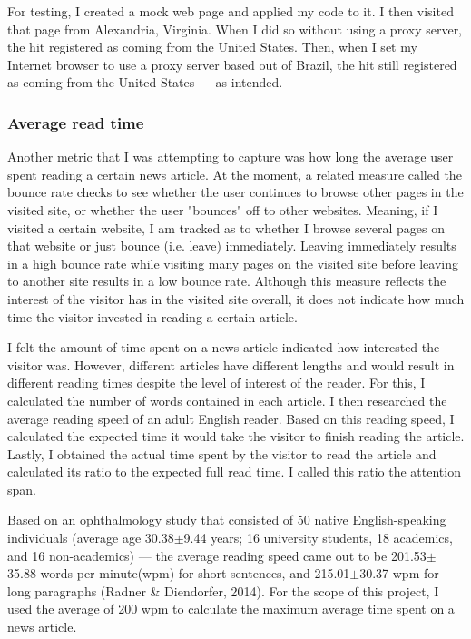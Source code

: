 \documentclass[12pt]{article}
\begin{document}
For testing, I created a mock web page and applied my code to it. I then visited that page from Alexandria, Virginia. When I did so without using a proxy server, the hit registered as coming from the United States. Then, when I set my Internet browser to use a proxy server based out of Brazil, the hit still registered as coming from the United States --- as intended.

\subsubsection{Average read time}

Another metric that I was attempting to capture was how long the average user spent reading a certain news article. At the moment, a related measure called the bounce rate checks to see whether the user continues to browse other pages in the visited site, or whether the user "bounces" off to other websites. Meaning, if I visited a certain website, I am tracked as to whether I browse several pages on that website or just bounce (i.e. leave) immediately. Leaving immediately results in a high bounce rate while visiting many pages on the visited site before leaving to another site results in a low bounce rate. Although this measure reflects the interest of the visitor has in the visited site overall, it does not indicate how much time the visitor invested in reading a certain article. 

I felt the amount of time spent on a news article indicated how interested the visitor was. However, different articles have different lengths and would result in different reading times despite the level of interest of the reader. For this, I calculated the number of words contained in each article. I then researched the average reading speed of an adult English reader. Based on this reading speed, I calculated the expected time it would take the visitor to finish reading the article. Lastly, I obtained the actual time spent by the visitor to read the article and calculated its ratio to the expected full read time. I called this ratio the attention span. 

Based on an ophthalmology study that consisted of 50 native English-speaking individuals (average age 30.38$\pm$9.44 years; 16 university students, 18 academics, and 16 non-academics) --- the average reading speed came out to be 201.53$\pm$35.88 words per minute(wpm) for short sentences, and 215.01$\pm$30.37 wpm for long paragraphs (Radner \& Diendorfer, 2014). For the scope of this project, I used the average of 200 wpm to calculate the maximum average time spent on a news article.  
\end{document}
